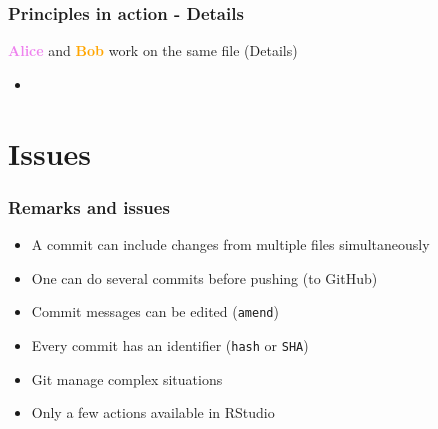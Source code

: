 \documentclass[xcolor=x11names,compress]{beamer}
\renewcommand{\(}{\begin{columns}}
\renewcommand{\)}{\end{columns}}
\newcommand{\<}[1]{\begin{column}{#1}}
\renewcommand{\>}{\end{column}}
\begin{document}
\begin{frame}
\frametitle{Principles in action - Details}
\textcolor{violet}{\textbf{Alice}} and \textcolor{orange}{\textbf{Bob}} work on the same file (Details)
\pause
\begin{itemize}
\item[]
\end{itemize}
\end{frame}

\section{Issues}

\begin{frame}
\frametitle{Remarks and issues}
    \begin{itemize}[<+->]
     \item A commit can include changes from multiple files simultaneously
     \item One can do several commits before pushing (to GitHub)
     \item Commit messages can be edited (\texttt{amend})
     \item Every commit has an identifier (\texttt{hash} or \texttt{SHA})
     \item Git manage complex situations
     \item Only a few actions available in RStudio
    \end{itemize}
\end{frame}
\end{document}
